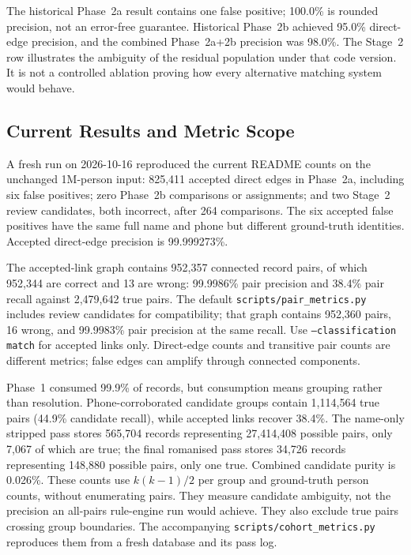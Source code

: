 \documentclass{article}
\begin{document}
The historical Phase~2a result contains one false positive; 100.0\% is rounded precision, not an error-free guarantee. Historical Phase~2b achieved 95.0\% direct-edge precision, and the combined Phase~2a+2b precision was 98.0\%. The Stage~2 row illustrates the ambiguity of the residual population under that code version. It is not a controlled ablation proving how every alternative matching system would behave.

\subsection{Current Results and Metric Scope}

A fresh run on 2026-10-16 reproduced the current README counts on the unchanged 1M-person input: 825,411 accepted direct edges in Phase~2a, including six false positives; zero Phase~2b comparisons or assignments; and two Stage~2 review candidates, both incorrect, after 264 comparisons. The six accepted false positives have the same full name and phone but different ground-truth identities. Accepted direct-edge precision is 99.999273\%.

The accepted-link graph contains 952,357 connected record pairs, of which 952,344 are correct and 13 are wrong: 99.9986\% pair precision and 38.4\% pair recall against 2,479,642 true pairs. The default \texttt{scripts/pair\_metrics.py} includes review candidates for compatibility; that graph contains 952,360 pairs, 16 wrong, and 99.9983\% pair precision at the same recall. Use \texttt{--classification match} for accepted links only. Direct-edge counts and transitive pair counts are different metrics; false edges can amplify through connected components.

Phase~1 consumed 99.9\% of records, but consumption means grouping rather than resolution. Phone-corroborated candidate groups contain 1,114,564 true pairs (44.9\% candidate recall), while accepted links recover 38.4\%. The name-only stripped pass stores 565,704 records representing 27,414,408 possible pairs, only 7,067 of which are true; the final romanised pass stores 34,726 records representing 148,880 possible pairs, only one true. Combined candidate purity is 0.026\%. These counts use $k(k-1)/2$ per group and ground-truth person counts, without enumerating pairs. They measure candidate ambiguity, not the precision an all-pairs rule-engine run would achieve. They also exclude true pairs crossing group boundaries. The accompanying \texttt{scripts/cohort\_metrics.py} reproduces them from a fresh database and its pass log.
\end{document}
